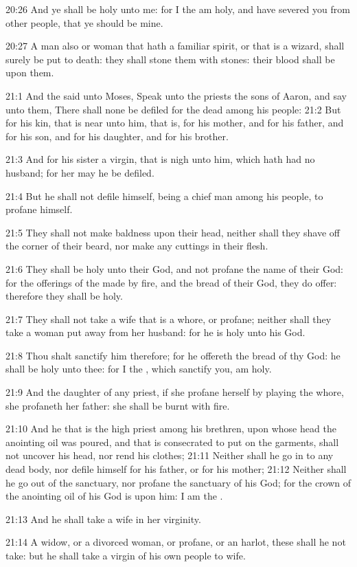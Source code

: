 20:26 And ye shall be holy unto me: for I the \LORD am holy, and have
severed you from other people, that ye should be mine.

20:27 A man also or woman that hath a familiar spirit, or that is a
wizard, shall surely be put to death: they shall stone them with
stones: their blood shall be upon them.

21:1 And the \LORD said unto Moses, Speak unto the priests the sons of
Aaron, and say unto them, There shall none be defiled for the dead
among his people: 21:2 But for his kin, that is near unto him, that
is, for his mother, and for his father, and for his son, and for his
daughter, and for his brother.

21:3 And for his sister a virgin, that is nigh unto him, which hath
had no husband; for her may he be defiled.

21:4 But he shall not defile himself, being a chief man among his
people, to profane himself.

21:5 They shall not make baldness upon their head, neither shall they
shave off the corner of their beard, nor make any cuttings in their
flesh.

21:6 They shall be holy unto their God, and not profane the name of
their God: for the offerings of the \LORD made by fire, and the bread
of their God, they do offer: therefore they shall be holy.

21:7 They shall not take a wife that is a whore, or profane; neither
shall they take a woman put away from her husband: for he is holy unto
his God.

21:8 Thou shalt sanctify him therefore; for he offereth the bread of
thy God: he shall be holy unto thee: for I the \LORD, which sanctify
you, am holy.

21:9 And the daughter of any priest, if she profane herself by playing
the whore, she profaneth her father: she shall be burnt with fire.

21:10 And he that is the high priest among his brethren, upon whose
head the anointing oil was poured, and that is consecrated to put on
the garments, shall not uncover his head, nor rend his clothes; 21:11
Neither shall he go in to any dead body, nor defile himself for his
father, or for his mother; 21:12 Neither shall he go out of the
sanctuary, nor profane the sanctuary of his God; for the crown of the
anointing oil of his God is upon him: I am the \LORD.

21:13 And he shall take a wife in her virginity.

21:14 A widow, or a divorced woman, or profane, or an harlot, these
shall he not take: but he shall take a virgin of his own people to
wife.


